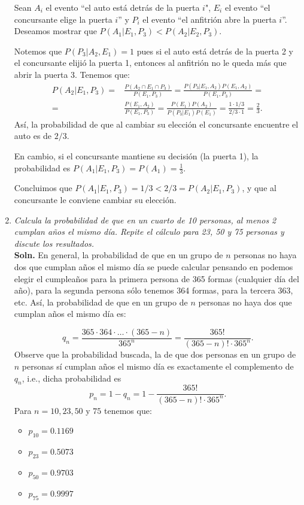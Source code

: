 \documentclass[letterpaper,11pt]{article}
\begin{document}
\begin{enumerate}
    Sean $A_i$ el evento ``el auto está detrás de la puerta $i$", $E_i$ el evento ``el concursante elige la
    puerta $i$'' y $P_i$ el evento ``el anfitrión abre la puerta $i$''. Deseamos mostrar que
    $P(A_1|E_1,P_3)<P(A_2|E_2,P_3)$.

    Notemos que $P(P_3|A_2,E_1)=1$ pues si el auto está detrás de la puerta 2 y el concursante elijió la
    puerta 1, entonces al anfitrión no le queda más que abrir la puerta 3. Tenemos que:
    \begin{align*}
    P(A_2|E_1,P_3)=& \frac{P(A_2\cap E_1\cap P_3)}{P(E_1,P_3)}=\frac{P(P_3|E_1,A_2)P(E_1,A_2)}{P(E_1,P_3)}=\\
    =& \frac{P(E_1,A_2)}{P(E_1,P_3)}=\frac{P(E_1)P(A_2)}{P(P_3|E_1)P(E_1)}=\frac{1\cdot 1/3}{2/3\cdot
    1}=\frac{2}{3}.
\end{align*}
Así, la probabilidad de que al cambiar su elección el concursante encuentre el auto es de $2/3$. 

En cambio, si el concursante mantiene su decisión (la puerta 1), la probabilidad es
$P(A_1|E_1,P_3)=P(A_1)=\frac{1}{3}$. 

Concluimos que $P(A_1|E_1,P_3)=1/3<2/3=P(A_2|E_1,P_3)$, y que al concursante le conviene cambiar su elección.

\item \emph{Calcula la probabilidad de que en un cuarto de 10 personas, al menos 2 cumplan años el
    mismo día. Repite el cálculo para 23, 50 y 75 personas y discute los resultados.}\\
    {\bf Soln.} En general, la probabilidad de que en un grupo de $n$ personas no haya dos que cumplan años el
    mismo día se puede calcular pensando en podemos elegir el cumpleaños para la primera persona de 365 formas
    (cualquier día del año), para la segunda persona sólo tenemos 364 formas, para la tercera 363, etc. Así,
    la probabilidad de que en un grupo de $n$ personas no haya dos que cumplan años el mismo día es:

    \[q_n= \frac{365\cdot 364 \cdot \dots\cdot(365-n)}{365^n}=\frac{365!}{(365-n)!\cdot 365^n}.\]
    Observe que la probabilidad buscada, la de que dos personas en un grupo de $n$ personas sí cumplan años el
    mismo día es exactamente el complemento de $q_n$, i.e., dicha probabilidad es
    \[p_n=1-q_n=1-\frac{365!}{(365-n)!\cdot 365^n}.\]
    Para $n=10,23,50$ y $75$ tenemos que:
    \begin{itemize}
        \item $p_{10}=0.1169$
        \item $p_{23}=0.5073$
        \item $p_{50}=0.9703$
        \item $p_{75}=0.9997$
    \end{itemize}
    

\end{enumerate}
\end{document}
